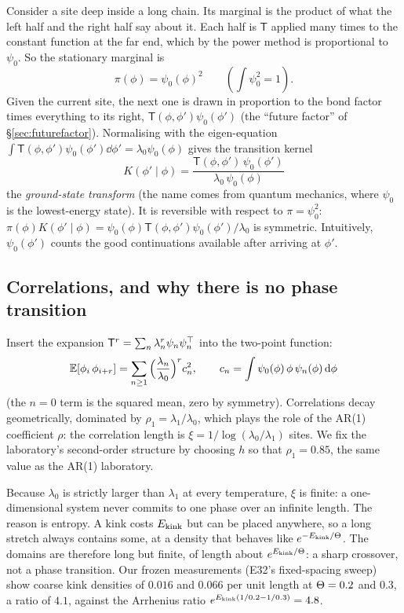 Consider a site deep inside a long chain. Its marginal is the product of what the left half and the right half
say about it. Each half is $\mathsf T$ applied many times to the constant function at the far end, which by the power
method is proportional to $\psi_0$. So the stationary marginal is
\begin{equation}\label{eq:psi0sq}
  \pi(\phi)=\psi_0(\phi)^2\qquad(\textstyle\int\psi_0^2=1).
\end{equation}
Given the current site, the next one is drawn in proportion to the bond factor times everything to its
right, $\mathsf T(\phi,\phi')\psi_0(\phi')$ (the ``future factor'' of \S\ref{sec:futurefactor}). Normalising with the
eigen-equation $\int\mathsf T(\phi,\phi')\psi_0(\phi')\dd\phi'=\lambda_0\psi_0(\phi)$ gives the transition kernel
\begin{equation}\label{eq:gst}
  \boxed{\;K(\phi'\mid\phi)=\frac{\mathsf T(\phi,\phi')\,\psi_0(\phi')}{\lambda_0\,\psi_0(\phi)}\;}
\end{equation}
the \emph{ground-state transform} (the name comes from quantum mechanics, where $\psi_0$ is the lowest-energy
state). It is reversible with respect to $\pi=\psi_0^2$: $\pi(\phi)K(\phi'\mid\phi)=\psi_0(\phi)\mathsf T(\phi,\phi')\psi_0(\phi')/\lambda_0$ is
symmetric. Intuitively, $\psi_0(\phi')$ counts the good continuations available after arriving at $\phi'$.

\subsection{Correlations, and why there is no phase transition}

Insert the expansion $\mathsf T^r=\sum_n\lambda_n^r\psi_n\psi_n^{\top}$ into the two-point function:
\begin{equation}\label{eq:corr}
  \mathbb{E}[\phi_i\,\phi_{i+r}]=\sum_{n\ge1}\Big(\frac{\lambda_n}{\lambda_0}\Big)^rc_n^2,\qquad c_n=\int\psi_0(\phi)\,\phi\,\psi_n(\phi)\,\mathrm{d}\phi
\end{equation}
(the $n=0$ term is the squared mean, zero by symmetry). Correlations decay geometrically, dominated by
$\rho_1=\lambda_1/\lambda_0$, which plays the role of the AR(1) coefficient $\rho$: the correlation length is
$\xi=1/\log(\lambda_0/\lambda_1)$ sites. We fix the laboratory's second-order structure by choosing $h$ so that
$\rho_1=0.85$, the same value as the AR(1) laboratory.

Because $\lambda_0$ is strictly larger than $\lambda_1$ at every temperature, $\xi$ is finite: a one-dimensional system
never commits to one phase over an infinite length. The reason is entropy. A kink costs $E_{\rm kink}$ but can be
placed anywhere, so a long stretch always contains some, at a density that behaves like $e^{-E_{\rm kink}/\Theta}$. The
domains are therefore long but finite, of length about $e^{E_{\rm kink}/\Theta}$: a sharp crossover, not a phase
transition. Our frozen measurements (E32's fixed-spacing sweep) show coarse kink densities of $0.016$ and $0.066$
per unit length at $\Theta=0.2$ and $0.3$, a ratio of $4.1$, against the Arrhenius ratio $e^{E_{\rm kink}(1/0.2-1/0.3)}=4.8$.

